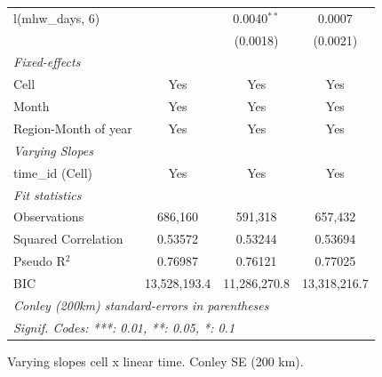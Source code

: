 \begin{table}[htbp]
\begin{tabular}{lccc}
      l(mhw\_days, 6)      &                & 0.0040$^{**}$ & 0.0007\\   
                           &                & (0.0018)      & (0.0021)\\   
      \midrule
      \emph{Fixed-effects}\\
      Cell                 & Yes            & Yes           & Yes\\  
      Month                & Yes            & Yes           & Yes\\  
      Region-Month of year & Yes            & Yes           & Yes\\  
      \midrule
      \emph{Varying Slopes}\\
      time\_id (Cell)      & Yes            & Yes           & Yes\\  
      \midrule
      \emph{Fit statistics}\\
      Observations         & 686,160        & 591,318       & 657,432\\  
      Squared Correlation  & 0.53572        & 0.53244       & 0.53694\\  
      Pseudo R$^2$         & 0.76987        & 0.76121       & 0.77025\\  
      BIC                  & 13,528,193.4   & 11,286,270.8  & 13,318,216.7\\  
      \midrule \midrule
      \multicolumn{4}{l}{\emph{Conley (200km) standard-errors in parentheses}}\\
      \multicolumn{4}{l}{\emph{Signif. Codes: ***: 0.01, **: 0.05, *: 0.1}}\\
   \end{tabular}
   
   \par \raggedright 
   Varying slopes cell x linear time. Conley SE (200 km).
\end{table}


